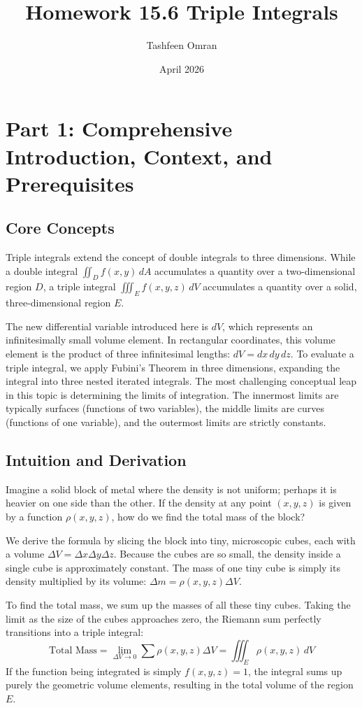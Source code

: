 \documentclass[12pt]{article}
\title{Homework 15.6 Triple Integrals}
\author{Tashfeen Omran}
\date{April 2026}
\begin{document}
\maketitle
\tableofcontents
\newpage

\section{Part 1: Comprehensive Introduction, Context, and Prerequisites}

\subsection{Core Concepts}
Triple integrals extend the concept of double integrals to three dimensions. While a double integral $\iint_D f(x,y) \, dA$ accumulates a quantity over a two-dimensional region $D$, a triple integral $\iiint_E f(x,y,z) \, dV$ accumulates a quantity over a solid, three-dimensional region $E$. 

The new differential variable introduced here is $dV$, which represents an infinitesimally small volume element. In rectangular coordinates, this volume element is the product of three infinitesimal lengths: $dV = dx \, dy \, dz$. To evaluate a triple integral, we apply Fubini's Theorem in three dimensions, expanding the integral into three nested iterated integrals. The most challenging conceptual leap in this topic is determining the limits of integration. The innermost limits are typically surfaces (functions of two variables), the middle limits are curves (functions of one variable), and the outermost limits are strictly constants.

\subsection{Intuition and Derivation}
Imagine a solid block of metal where the density is not uniform; perhaps it is heavier on one side than the other. If the density at any point $(x, y, z)$ is given by a function $\rho(x, y, z)$, how do we find the total mass of the block? 

We derive the formula by slicing the block into tiny, microscopic cubes, each with a volume $\Delta V = \Delta x \Delta y \Delta z$. Because the cubes are so small, the density inside a single cube is approximately constant. The mass of one tiny cube is simply its density multiplied by its volume: $\Delta m = \rho(x,y,z) \Delta V$. 

To find the total mass, we sum up the masses of all these tiny cubes. Taking the limit as the size of the cubes approaches zero, the Riemann sum perfectly transitions into a triple integral:
\[ \text{Total Mass} = \lim_{\Delta V \to 0} \sum \rho(x,y,z) \Delta V = \iiint_E \rho(x,y,z) \, dV \]
If the function being integrated is simply $f(x,y,z) = 1$, the integral sums up purely the geometric volume elements, resulting in the total volume of the region $E$.
\end{document}
